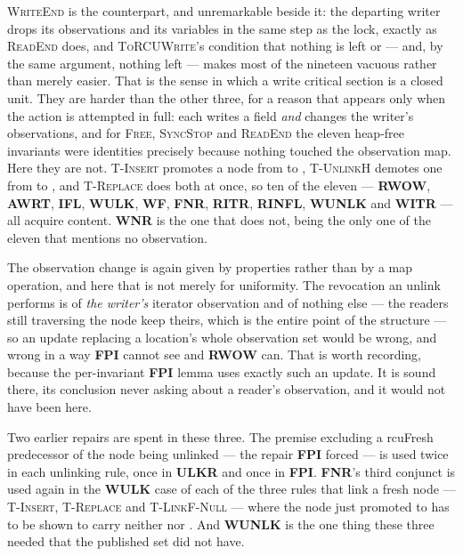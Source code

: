 \textsc{WriteEnd} is the counterpart, and unremarkable beside it: the departing
writer drops its observations and its variables in the same step as the lock,
exactly as \textsc{ReadEnd} does, and \textsc{ToRCUWrite}'s condition that
nothing is left \unlk{} or \frbl{} --- and, by the same argument, nothing left
\frsh{} --- makes most of the nineteen vacuous rather than merely easier.  That
is the sense in which a write critical section is a closed unit.  They are harder than the other three,
for a reason that appears only when the action is attempted in full: each
writes a field \emph{and} changes the writer's observations, and for
\textsc{Free}, \textsc{SyncStop} and \textsc{ReadEnd} the eleven heap-free
invariants were identities precisely because nothing touched the observation
map.  Here they are not.  \textsc{T-Insert} promotes a node from \frsh{} to
\itr{}, \textsc{T-UnlinkH} demotes one from \itr{} to \unlk{}, and
\textsc{T-Replace} does both at once, so ten of the eleven --- \textbf{RWOW},
\textbf{AWRT}, \textbf{IFL}, \textbf{WULK}, \textbf{WF}, \textbf{FNR},
\textbf{RITR}, \textbf{RINFL}, \textbf{WUNLK} and \textbf{WITR} --- all acquire
content.  \textbf{WNR} is the one that does not, being the only one of the
eleven that mentions no observation.

The observation change is again given by properties rather than by a map
operation, and here that is not merely for uniformity.  The revocation an
unlink performs is of \emph{the writer's} iterator observation and of nothing
else --- the readers still traversing the node keep theirs, which is the entire
point of the structure --- so an update replacing a location's whole
observation set would be wrong, and wrong in a way \textbf{FPI} cannot see and
\textbf{RWOW} can.  That is worth recording, because the per-invariant
\textbf{FPI} lemma uses exactly such an update.  It is sound there, its
conclusion never asking about a reader's observation, and it would not have
been here.

Two earlier repairs are spent in these three.  The premise excluding a
\textsf{rcuFresh} predecessor of the node being unlinked --- the repair
\textbf{FPI} forced --- is used twice in each unlinking rule, once in
\textbf{ULKR} and once in \textbf{FPI}.  \textbf{FNR}'s third conjunct is used
again in the \textbf{WULK} case of each of the three rules that link a fresh
node --- \textsc{T-Insert}, \textsc{T-Replace} and \textsc{T-LinkF-Null} ---
where the node just promoted to \itr{} has to be shown to carry neither \unlk{}
nor \frbl{}.  And \textbf{WUNLK} is the one thing these three needed that the
published set did not have.

